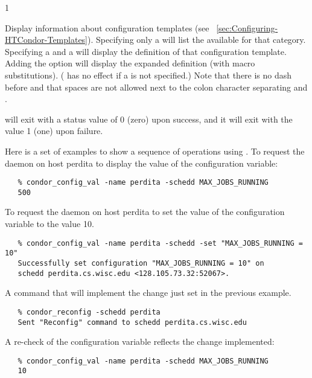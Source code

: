 \begin{ManPage}{\label{man-condor-config-val}}{1}
\begin{Options}
    {Display information about configuration templates (see
    ~\ref{sec:Configuring-HTCondor-Templates}).
    Specifying only a  will list the 
    available for that category.
    Specifying a  and a  will display
    the definition of that configuration template.
    Adding the  option will display the expanded
    definition (with macro substitutions).  ( has no
    effect if a  is not specified.)
    Note that there is no dash before  and that spaces are not
    allowed next to the colon character separating 
    and .
    }
    
\end{Options}

\ExitStatus

 will exit with a status value of 0 (zero) upon success,
and it will exit with the value 1 (one) upon failure.

\Examples

Here is a set of examples to show a sequence of operations using 
.
To request the  daemon on host perdita
to display the value of the  configuration variable:
\footnotesize
\begin{verbatim}
   % condor_config_val -name perdita -schedd MAX_JOBS_RUNNING
   500
\end{verbatim}
\normalsize

To request the  daemon on host perdita
to set the value of the  configuration variable
to the value 10.
\footnotesize
\begin{verbatim}
   % condor_config_val -name perdita -schedd -set "MAX_JOBS_RUNNING = 10"
   Successfully set configuration "MAX_JOBS_RUNNING = 10" on 
   schedd perdita.cs.wisc.edu <128.105.73.32:52067>.
\end{verbatim}
\normalsize

A command that will implement the change just set in the previous
example.
\footnotesize
\begin{verbatim}
   % condor_reconfig -schedd perdita
   Sent "Reconfig" command to schedd perdita.cs.wisc.edu
\end{verbatim}
\normalsize

A re-check of the configuration variable reflects the change implemented:
\footnotesize
\begin{verbatim}
   % condor_config_val -name perdita -schedd MAX_JOBS_RUNNING
   10
\end{verbatim}
\normalsize


\end{ManPage}
